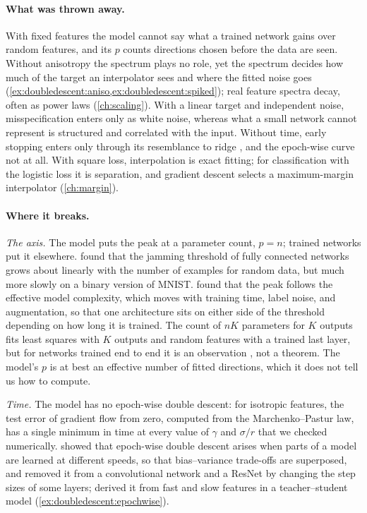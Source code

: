 \begin{refsection}
\paragraph{What was thrown away.} With fixed features the model cannot say what a trained network gains over random features, and its $p$ counts directions chosen before the data are seen. Without anisotropy the spectrum plays no role, yet the spectrum decides how much of the target an interpolator sees and where the fitted noise goes (\cref{ex:doubledescent:aniso,ex:doubledescent:spiked}); real feature spectra decay, often as power laws (\cref{ch:scaling}). With a linear target and independent noise, misspecification enters only as white noise, whereas what a small network cannot represent is structured and correlated with the input. Without time, early stopping enters only through its resemblance to ridge \parencite{AdvaniEtAl2020}, and the epoch-wise curve not at all. With square loss, interpolation is exact fitting; for classification with the logistic loss it is separation, and gradient descent selects a maximum-margin interpolator (\cref{ch:margin}).

\paragraph{Where it breaks.} \emph{The axis.} The model puts the peak at a parameter count, $p=n$; trained networks put it elsewhere. \Textcite{SpiglerEtAl2019} found that the jamming threshold of fully connected networks grows about linearly with the number of examples for random data, but much more slowly on a binary version of MNIST. \Textcite{NakkiranEtAl2020} found that the peak follows the effective model complexity, which moves with training time, label noise, and augmentation, so that one architecture sits on either side of the threshold depending on how long it is trained. The count of $nK$ parameters for $K$ outputs \parencite{BelkinEtAl2019} fits least squares with $K$ outputs and random features with a trained last layer, but for networks trained end to end it is an observation \parencite{AdvaniEtAl2020}, not a theorem. The model's $p$ is at best an effective number of fitted directions, which it does not tell us how to compute.

\emph{Time.} The model has no epoch-wise double descent: for isotropic features, the test error of gradient flow from zero, computed from the Marchenko--Pastur law, has a single minimum in time at every value of $\gamma$ and $\sigma/r$ that we checked numerically. \Textcite{HeckelYilmaz2021} showed that epoch-wise double descent arises when parts of a model are learned at different speeds, so that bias--variance trade-offs are superposed, and removed it from a convolutional network and a ResNet by changing the step sizes of some layers; \textcite{PezeshkiEtAl2022} derived it from fast and slow features in a teacher--student model (\cref{ex:doubledescent:epochwise}).


\end{refsection}
